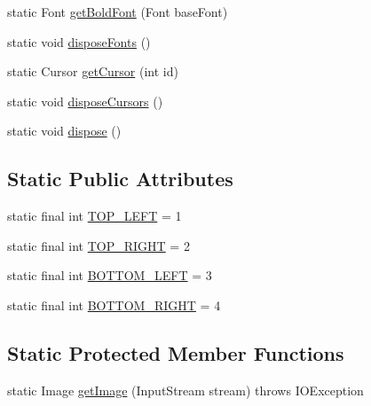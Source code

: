 \begin{DoxyCompactItemize}
static Font \hyperlink{classorg_1_1eclipse_1_1wb_1_1swt_1_1_s_w_t_resource_manager_aef062a156595d89be832e57db9af330e}{get\-Bold\-Font} (Font base\-Font)
\item 
static void \hyperlink{classorg_1_1eclipse_1_1wb_1_1swt_1_1_s_w_t_resource_manager_aaa6fb021a026244859bbf1702639c307}{dispose\-Fonts} ()
\item 
static Cursor \hyperlink{classorg_1_1eclipse_1_1wb_1_1swt_1_1_s_w_t_resource_manager_a53570bdd6ea06fca8ad835f12dced0bf}{get\-Cursor} (int id)
\item 
static void \hyperlink{classorg_1_1eclipse_1_1wb_1_1swt_1_1_s_w_t_resource_manager_ab676d0706260a2203684b0bbd734aef5}{dispose\-Cursors} ()
\item 
static void \hyperlink{classorg_1_1eclipse_1_1wb_1_1swt_1_1_s_w_t_resource_manager_ae2266672ae9c04dd76064692cda459b5}{dispose} ()
\end{DoxyCompactItemize}
\subsection*{Static Public Attributes}
\begin{DoxyCompactItemize}
\item 
static final int \hyperlink{classorg_1_1eclipse_1_1wb_1_1swt_1_1_s_w_t_resource_manager_af08860b87174c2dd3f095c776040bcf8}{T\-O\-P\-\_\-\-L\-E\-F\-T} = 1
\item 
static final int \hyperlink{classorg_1_1eclipse_1_1wb_1_1swt_1_1_s_w_t_resource_manager_a024b59862eb3bc6eec12dd2bec92c1e5}{T\-O\-P\-\_\-\-R\-I\-G\-H\-T} = 2
\item 
static final int \hyperlink{classorg_1_1eclipse_1_1wb_1_1swt_1_1_s_w_t_resource_manager_a4f0d49da071dc4f1b575de93e27c074c}{B\-O\-T\-T\-O\-M\-\_\-\-L\-E\-F\-T} = 3
\item 
static final int \hyperlink{classorg_1_1eclipse_1_1wb_1_1swt_1_1_s_w_t_resource_manager_ae0ed56ec45ea09895f7fba82814622d0}{B\-O\-T\-T\-O\-M\-\_\-\-R\-I\-G\-H\-T} = 4
\end{DoxyCompactItemize}
\subsection*{Static Protected Member Functions}
\begin{DoxyCompactItemize}
\item 
static Image \hyperlink{classorg_1_1eclipse_1_1wb_1_1swt_1_1_s_w_t_resource_manager_aeda8d2db55efe0bc2b46fcc50f5e6bb0}{get\-Image} (Input\-Stream stream)  throws I\-O\-Exception 
\end{DoxyCompactItemize}
